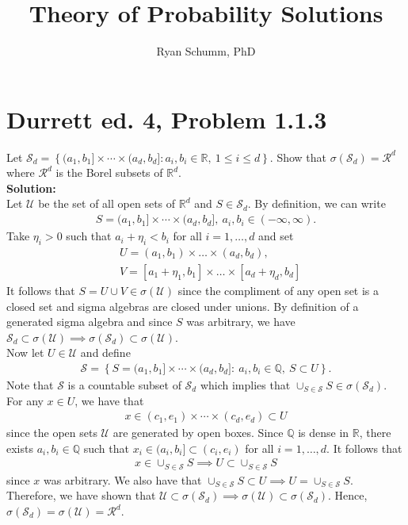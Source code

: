 \documentclass[12pt]{article}
\title{Theory of Probability Solutions}
\author{Ryan Schumm, PhD}
\date{}
\newcommand{\Sd}{\mathcal{S}_d}
\newcommand{\U}{\mathcal{U}}
\begin{document}
    \maketitle
    \setlength{\parindent}{0pt}

    \section*{Durrett ed. 4, Problem 1.1.3}
    Let $\mathcal{S}_d = \left\{(a_1, b_1]\times\cdots\times(a_d, b_d]: a_i, b_i\in\mathbb R, \ 1 \leq i \leq d\right\}$. Show that 
    $\sigma\left(\mathcal S_d\right) = \mathcal R^d$ where $\mathcal R^d$ is the Borel subsets of $\mathbb R^d$.\\

    \textbf{Solution:}\\
    Let $\U$ be the set of all open sets of $\mathbb R^d$ and $S\in\Sd$. By definition, we can write
    \begin{align*}
        S = (a_1, b_1]\times\cdots\times(a_d, b_d], \ a_i, b_i\in(-\infty, \infty).
    \end{align*}
    Take $\eta_i > 0$ such that $a_i + \eta_i < b_i$ for all $i = 1,\ldots,d$ and set 
    \begin{align}
        &U = (a_1, b_1)\times\ldots\times(a_d, b_d),\\
        &V = [a_1 + \eta_1, b_1]\times\ldots\times[a_d + \eta_d, b_d]
    \end{align}
    It follows that $S = U \cup V\in\sigma(\U)$ since the compliment of any open set is a closed set and sigma algebras are closed under unions. By definition 
    of a generated sigma algebra and since $S$ was arbitrary, we have $\Sd\subset\sigma(\U)\implies\sigma(\Sd)\subset\sigma(\U)$.\\

    Now let $U\in\U$ and define
    \begin{align}
        \label{rat-recs}
        \mathscr S = \left\{S = (a_1, b_1]\times\cdots\times(a_d, b_d]: \ a_i, b_i\in\mathbb Q, \ S\subset U \right\}.
    \end{align}
    Note that $\mathscr S$ is a countable subset of $\Sd$ which implies that $\cup_{S\in \mathscr S}S\in \sigma(\Sd)$. For any $x \in U$, we have that 
    \begin{align}
        x\in(c_1, e_1)\times\cdots\times(c_d, e_d)\subset U
    \end{align}
    since the open sets $\U$ are generated by open boxes. Since $\mathbb Q$ is dense in $\mathbb R$, there exists $a_i, b_i\in\mathbb Q$ such that 
    $x_i\in(a_i, b_i]\subset (c_i, e_i)$ for all $i=1,\ldots,d$. It follows that 
    \begin{align}
        x\in\cup_{S\in \mathscr S}S\implies U\subset\cup_{S\in \mathscr S}S
    \end{align}
    since $x$ was
    arbitrary. We also have that $\cup_{S\in \mathscr S}S\subset U \implies U = \cup_{S\in \mathscr S}S$. Therefore, we have shown that
    $\U\subset \sigma(\Sd)\implies \sigma(\U)\subset \sigma(\Sd)$. Hence, $\sigma(\Sd) = \sigma(\U) = \mathcal R^d$.
    
\end{document}
